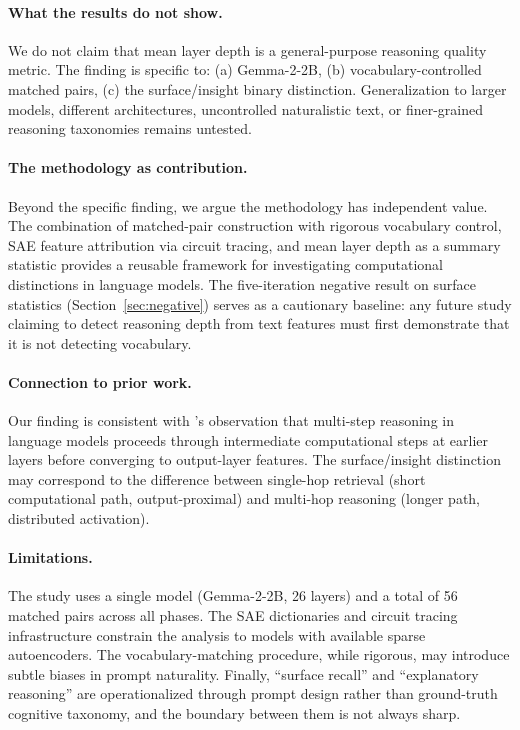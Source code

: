 \documentclass[10pt]{article}
\begin{document}
\paragraph{What the results do not show.}
We do not claim that mean layer depth is a general-purpose reasoning quality metric. The finding is specific to: (a) Gemma-2-2B, (b) vocabulary-controlled matched pairs, (c) the surface/insight binary distinction. Generalization to larger models, different architectures, uncontrolled naturalistic text, or finer-grained reasoning taxonomies remains untested.

\paragraph{The methodology as contribution.}
Beyond the specific finding, we argue the methodology has independent value. The combination of matched-pair construction with rigorous vocabulary control, SAE feature attribution via circuit tracing, and mean layer depth as a summary statistic provides a reusable framework for investigating computational distinctions in language models. The five-iteration negative result on surface statistics (Section~\ref{sec:negative}) serves as a cautionary baseline: any future study claiming to detect reasoning depth from text features must first demonstrate that it is not detecting vocabulary.

\paragraph{Connection to prior work.}
Our finding is consistent with \citet{anthropic2025biology}'s observation that multi-step reasoning in language models proceeds through intermediate computational steps at earlier layers before converging to output-layer features. The surface/insight distinction may correspond to the difference between single-hop retrieval (short computational path, output-proximal) and multi-hop reasoning (longer path, distributed activation).

\paragraph{Limitations.}
The study uses a single model (Gemma-2-2B, 26 layers) and a total of 56 matched pairs across all phases. The SAE dictionaries and circuit tracing infrastructure constrain the analysis to models with available sparse autoencoders. The vocabulary-matching procedure, while rigorous, may introduce subtle biases in prompt naturality. Finally, ``surface recall'' and ``explanatory reasoning'' are operationalized through prompt design rather than ground-truth cognitive taxonomy, and the boundary between them is not always sharp.
\end{document}
